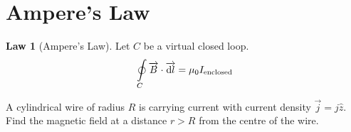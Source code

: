 \documentclass[fleqn, a4paper, 12pt, twoside]{article}
\theoremstyle{definition}
\theoremstyle{theorem}
\newtheorem{law}{Law}
\begin{document}
\section{Ampere's Law}

\begin{law}[Ampere's Law]
	Let $C$ be a virtual closed loop.
	\begin{equation*}
		\oint\limits_{C} \overrightarrow{B} \cdot \overrightarrow{\dif l} = \mu_0 I_{\textnormal{enclosed}}
	\end{equation*}
	\label{Ampere's_Law}
\end{law}

\begin{question}
	A cylindrical wire of radius $R$ is carrying current with current density $\overrightarrow{j} = j \hat{z}$.
	Find the magnetic field at a distance $r > R$ from the centre of the wire.
\end{question}
\end{document}
